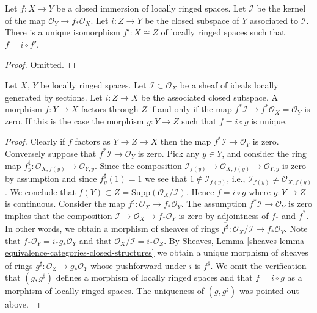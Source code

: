 \begin{lemma}
\label{lemma-closed-immersion}
Let $f : X \to Y$ be a closed immersion of
locally ringed spaces. Let $\mathcal{I}$ be the
kernel of the map $\mathcal{O}_Y \to f_*\mathcal{O}_X$.
Let $i : Z \to Y$ be the closed subspace of $Y$
associated to $\mathcal{I}$.
There is a unique isomorphism $f' : X \cong Z$ of
locally ringed spaces such that $f = i \circ f'$.
\end{lemma}

\begin{proof}
Omitted.
\end{proof}

\begin{lemma}
\label{lemma-characterize-closed-subspace}
Let $X$, $Y$ be locally ringed spaces. Let
$\mathcal{I} \subset \mathcal{O}_X$ be a sheaf of ideals locally generated
by sections. Let $i : Z \to X$ be the associated closed subspace.
A morphism $f : Y \to X$ factors through $Z$ if and only if the map
$f^*\mathcal{I} \to f^*\mathcal{O}_X = \mathcal{O}_Y$
is zero. If this is the case the morphism $g : Y \to Z$
such that $f = i \circ g$ is unique.
\end{lemma}

\begin{proof}
Clearly if $f$ factors as $Y \to Z \to X$ then the map
$f^*\mathcal{I} \to \mathcal{O}_Y$ is zero. Conversely
suppose that $f^*\mathcal{I} \to \mathcal{O}_Y$ is zero.
Pick any $y \in Y$, and consider the ring map
$f^\sharp_y : \mathcal{O}_{X, f(y)} \to \mathcal{O}_{Y, y}$.
Since the composition
$\mathcal{I}_{f(y)} \to \mathcal{O}_{X, f(y)} \to \mathcal{O}_{Y, y}$
is zero by assumption and since $f^\sharp_y(1) = 1$
we see that $1 \not \in \mathcal{I}_{f(y)}$, i.e.,
$\mathcal{I}_{f(y)} \not = \mathcal{O}_{X, f(y)}$. We conclude that
$f(Y) \subset Z = \text{Supp}(\mathcal{O}_X/\mathcal{I})$.
Hence $f = i \circ g$ where $g : Y \to Z$ is continuous.
Consider the map $f^\sharp : \mathcal{O}_X \to f_*\mathcal{O}_Y$.
The assumption $f^*\mathcal{I} \to \mathcal{O}_Y$ is zero implies that
the composition $\mathcal{I} \to \mathcal{O}_X \to f_*\mathcal{O}_Y$ is
zero by adjointness of $f_*$ and $f^*$.
In other words, we obtain a morphism of sheaves of rings
$\overline{f^\sharp} : \mathcal{O}_X/\mathcal{I} \to f_*\mathcal{O}_Y$.
Note that $f_*\mathcal{O}_Y = i_*g_*\mathcal{O}_Y$ and
that $\mathcal{O}_X/\mathcal{I} = i_*\mathcal{O}_Z$.
By Sheaves, Lemma \ref{sheaves-lemma-equivalence-categories-closed-structures}
we obtain a unique morphism of sheaves of rings
$g^\sharp : \mathcal{O}_Z \to g_*\mathcal{O}_Y$ whose pushforward
under $i$ is $\overline{f^\sharp}$. We omit the verification that
$(g, g^\sharp)$ defines a morphism of locally ringed spaces
and that $f = i \circ g$ as a morphism of locally ringed spaces.
The uniqueness of $(g, g^\sharp)$ was pointed out above.
\end{proof}

